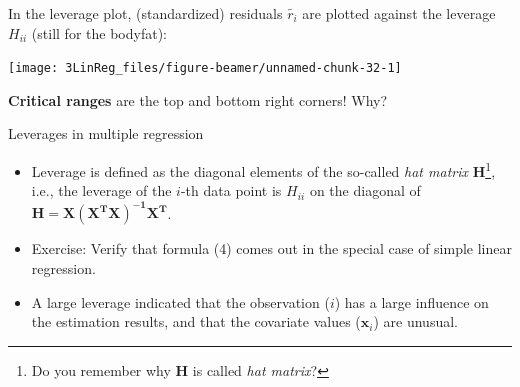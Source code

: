 \documentclass[10pt,ignorenonframetext,]{beamer}
\providecommand{\tightlist}{%
  \setlength{\itemsep}{0pt}\setlength{\parskip}{0pt}}
\begin{document}
\begin{frame}

In the leverage plot, (standardized) residuals \(\tilde{r_i}\) are
plotted against the leverage \(H_{ii}\) (still for the bodyfat):

\begin{center}\texttt{[image: 3LinReg\_files/figure-beamer/unnamed-chunk-32-1]} \end{center}

\textbf{Critical ranges} are the top and bottom right corners! Why?

\end{frame}

\begin{frame}

\begin{block}{Leverages in multiple regression}

\vspace{3mm}

\begin{itemize}
\tightlist
\item
  Leverage is defined as the diagonal elements of the so-called
  \emph{hat matrix}
  \(\mathbf{H}\)\footnote{Do you remember why $\mathbf{H}$ is called \emph{hat matrix}?},
  i.e., the leverage of the \(i\)-th data point is \(H_{ii}\) on the
  diagonal of \(\mathbf{H = X(X^TX)^{-1}X^T}\).
\end{itemize}

\vspace{1mm}

\begin{itemize}
\tightlist
\item
  Exercise: Verify that formula (4) comes out in the special case of
  simple linear regression.
\end{itemize}

\vspace{1mm}

\begin{itemize}
\tightlist
\item
  A large leverage indicated that the observation (\(i\)) has a large
  influence on the estimation results, and that the covariate values
  (\({\boldsymbol x}_i\)) are unusual.
\end{itemize}

\end{block}

\end{frame}
\end{document}
